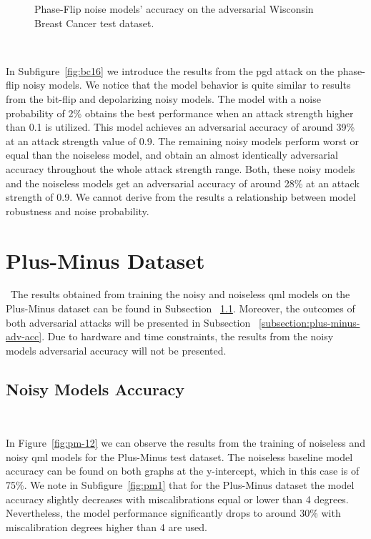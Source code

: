 \begin{figure}[!h]
  \caption{Phase-Flip noise models' accuracy on the adversarial Wisconsin Breast Cancer test dataset.}
  \label{fig:bc-1516}
\end{figure} \

In Subfigure~\ref{fig:bc16} we introduce the results from the \ac{pgd}
attack on the phase-flip noisy models. We notice that the model behavior
is quite similar to results from the bit-flip and depolarizing noisy
models. The model with a noise probability of 2\% obtains the best performance
when an attack strength higher than 0.1 is utilized. This model achieves
an adversarial accuracy of around 39\% at an attack strength value of
0.9. The remaining noisy models perform worst or equal than the
noiseless model, and obtain an almost identically adversarial
accuracy throughout the whole attack strength range. Both, these noisy
models and the noiseless models get an adversarial accuracy of around
28\% at an attack strength of 0.9. We cannot derive from the results
a relationship between model robustness and noise probability. \

\section{Plus-Minus Dataset}\label{section:plus-minus-eval} \
The results obtained from training the noisy and noiseless
\ac{qml} models on the Plus-Minus dataset can be found in Subsection
~\ref{subsection:plus-minus-noisy-acc}. Moreover, the outcomes
of both adversarial attacks will be presented in Subsection
~\ref{subsection:plus-minus-adv-acc}. Due to hardware and time constraints,
the results from the noisy models adversarial accuracy will not
be presented. \

\subsection{Noisy Models Accuracy}\label{subsection:plus-minus-noisy-acc} \

In Figure~\ref{fig:pm-12} we can observe the results
from the training of noiseless and noisy \ac{qml} models
for the Plus-Minus test dataset. The noiseless baseline model accuracy
can be found on both graphs at the y-intercept, which in
this case is of 75\%. We note in Subfigure~\ref{fig:pm1}
that for the Plus-Minus dataset the model accuracy slightly decreases
with miscalibrations equal or lower than 4 degrees. Nevertheless,
the model performance significantly drops to around 30\% with
miscalibration degrees higher than 4 are used. \

